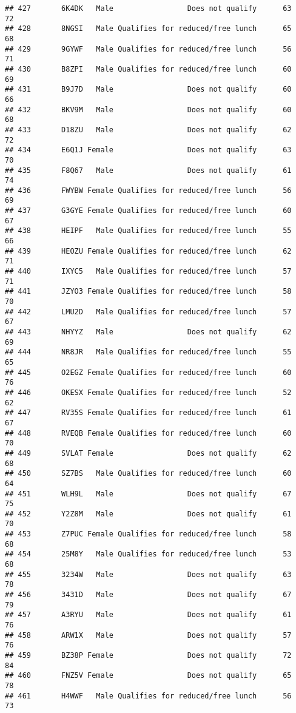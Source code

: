 \documentclass[
]{article}
\begin{document}
\begin{verbatim}
## 427       6K4DK   Male                 Does not qualify      63       72
## 428       8NGSI   Male Qualifies for reduced/free lunch      65       68
## 429       9GYWF   Male Qualifies for reduced/free lunch      56       71
## 430       B8ZPI   Male Qualifies for reduced/free lunch      60       69
## 431       B9J7D   Male                 Does not qualify      60       66
## 432       BKV9M   Male                 Does not qualify      60       68
## 433       D18ZU   Male                 Does not qualify      62       72
## 434       E6Q1J Female                 Does not qualify      63       70
## 435       F8Q67   Male                 Does not qualify      61       74
## 436       FWYBW Female Qualifies for reduced/free lunch      56       69
## 437       G3GYE Female Qualifies for reduced/free lunch      60       67
## 438       HEIPF   Male Qualifies for reduced/free lunch      55       66
## 439       HEOZU Female Qualifies for reduced/free lunch      62       71
## 440       IXYC5   Male Qualifies for reduced/free lunch      57       71
## 441       JZYO3 Female Qualifies for reduced/free lunch      58       70
## 442       LMU2D   Male Qualifies for reduced/free lunch      57       67
## 443       NHYYZ   Male                 Does not qualify      62       69
## 444       NR8JR   Male Qualifies for reduced/free lunch      55       65
## 445       O2EGZ Female Qualifies for reduced/free lunch      60       76
## 446       OKESX Female Qualifies for reduced/free lunch      52       62
## 447       RV35S Female Qualifies for reduced/free lunch      61       67
## 448       RVEQB Female Qualifies for reduced/free lunch      60       70
## 449       SVLAT Female                 Does not qualify      62       68
## 450       SZ7BS   Male Qualifies for reduced/free lunch      60       64
## 451       WLH9L   Male                 Does not qualify      67       75
## 452       Y2Z8M   Male                 Does not qualify      61       70
## 453       Z7PUC Female Qualifies for reduced/free lunch      58       68
## 454       25M8Y   Male Qualifies for reduced/free lunch      53       68
## 455       3234W   Male                 Does not qualify      63       78
## 456       3431D   Male                 Does not qualify      67       79
## 457       A3RYU   Male                 Does not qualify      61       76
## 458       ARW1X   Male                 Does not qualify      57       76
## 459       BZ38P Female                 Does not qualify      72       84
## 460       FNZ5V Female                 Does not qualify      65       78
## 461       H4WWF   Male Qualifies for reduced/free lunch      56       73

\end{verbatim}
\end{document}
